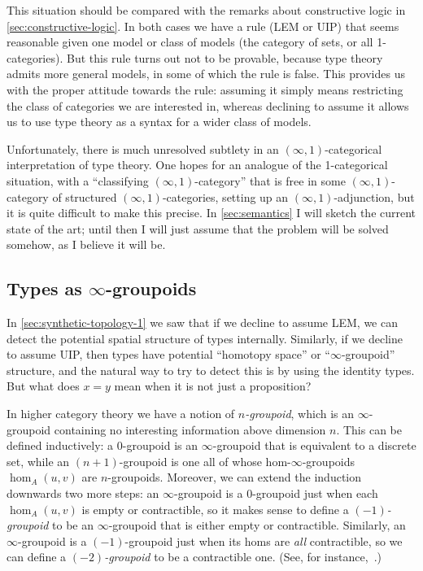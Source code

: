 \documentclass[10pt]{article}
\def\oo{\ensuremath{\infty}}
\def\io{\ensuremath{(\oo,1)}}
\def\N{\mathbb{N}}
\def\R{\mathbb{R}}
\numberwithin{equation}{section}
\begin{document}
This situation should be compared with the remarks about constructive logic in \cref{sec:constructive-logic}.
In both cases we have a rule (LEM or UIP) that seems reasonable given one model or class of models (the category of sets, or all 1-categories).
But this rule turns out not to be provable, because type theory admits more general models, in some of which the rule is false.
This provides us with the proper attitude towards the rule: assuming it simply means restricting the class of categories we are interested in, whereas declining to assume it allows us to use type theory as a syntax for a wider class of models.

Unfortunately, there is much unresolved subtlety in an $\io$-categorical interpretation of type theory.
One hopes for an analogue of the 1-categorical situation, with a ``classifying $\io$-category'' that is free in some \io-category of structured \io-categories, setting up an \io-adjunction, but it is quite difficult to make this precise.
In \cref{sec:semantics} I will sketch the current state of the art; until then I will just assume that the problem will be solved somehow, as I believe it will be.


\subsection{Types as \oo-groupoids}
\label{sec:oo-group-struct}

In \cref{sec:synthetic-topology-1} we saw that if we decline to assume LEM, we can detect the potential spatial structure of types internally. %
Similarly, if we decline to assume UIP, then types have potential ``homotopy space'' or ``\oo-groupoid'' structure, and the natural way to try to detect this is by using the identity types.
But what does $x=y$ mean when it is not just a proposition?

In higher category theory we have a notion of \emph{$n$-groupoid}, which is an \oo-groupoid containing no interesting information above dimension $n$.
This can be defined inductively: a $0$-groupoid is an \oo-groupoid that is equivalent to a discrete set, while an $(n+1)$-groupoid is one all of whose hom-\oo-groupoids $\hom_A(u,v)$ are $n$-groupoids.
Moreover, we can extend the induction downwards two more steps: an \oo-groupoid is a $0$-groupoid just when each $\hom_A(u,v)$ is empty or contractible, so it makes sense to define a \emph{$(-1)$-groupoid} to be an \oo-groupoid that is either empty or contractible.
Similarly, an \oo-groupoid is a $(-1)$-groupoid just when its homs are \emph{all} contractible, so we can define a \emph{$(-2)$-groupoid} to be a contractible one.
(See, for instance,~\cite[\S2]{bs:ncats-cohom}.)
\end{document}
